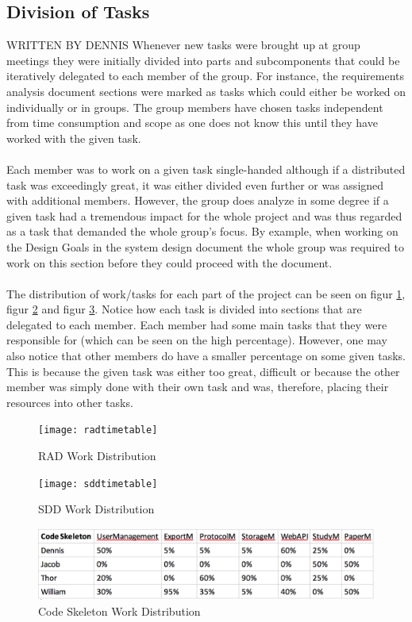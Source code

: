 \subsection{Division of Tasks}
WRITTEN BY DENNIS 
Whenever new tasks were brought up at group meetings they were initially divided into parts and subcomponents that could be iteratively delegated to each member of the group. For instance, the requirements analysis document sections were marked as tasks which could either be worked on individually or in groups. The group members have chosen tasks independent from time consumption and scope as one does not know this until they have worked with the given task.\\\\ Each member was to work on a given task single-handed although if a distributed task was exceedingly great, it was either divided even further or was assigned with additional members. However, the group does analyze in some degree if a given task had a tremendous impact  for the whole project and was thus regarded as a task that demanded the whole group's focus. By example, when working on the Design Goals in the system design document the whole group was required to work on this section before they could proceed with the document. \\\\The distribution of work/tasks for each part of the project can be seen on figur \ref{fig:rad}, figur \ref{fig:sdd} and figur \ref{fig:codeskeleton}. Notice how each task is divided into sections that are delegated to each member. Each member had some main tasks that they were responsible for (which can be seen on the high percentage). However, one may also notice that other members do have a smaller percentage on some given tasks. This is because the given task was either too great, difficult or because the other member was simply done with their own task and was, therefore, placing their resources into other tasks.


\begin{figure}[H]
	\centering
	\texttt{[image: radtimetable]}
	\caption{RAD Work Distribution}
	\label{fig:rad}
\end{figure}

\begin{figure}[H]
	\centering
	\texttt{[image: sddtimetable]}
	\caption{SDD Work Distribution}
	\label{fig:sdd}
\end{figure}

\begin{figure}[H]
	\centering
	\includegraphics[width=150mm]{image/skeletontimetable}
	\caption{Code Skeleton Work Distribution}
	\label{fig:codeskeleton} %
\end{figure}
